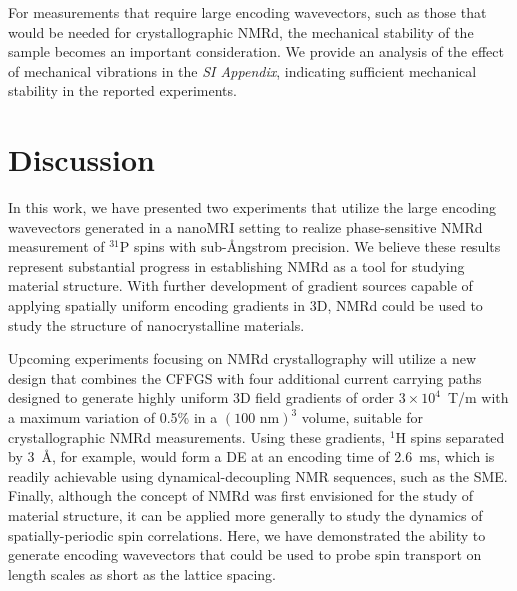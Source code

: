 \documentclass[9pt,twocolumn,twoside,lineno]{pnas-new}
\begin{document}
For measurements that require large encoding wavevectors, such as those that would be needed for crystallographic NMRd, the mechanical stability of the sample becomes an important consideration. We provide an analysis of the effect of mechanical vibrations in the \textit{SI Appendix}, indicating sufficient mechanical stability in the reported experiments.

\section*{Discussion}
In this work, we have presented two experiments that utilize the large encoding wavevectors generated in a nanoMRI setting to realize phase-sensitive NMRd measurement of ${}^{31}$P spins with sub-\AA ngstrom precision.
We believe these results represent substantial progress in establishing NMRd as a tool for studying material structure.
With further development of gradient sources capable of applying spatially uniform encoding gradients in 3D, NMRd could be used to study the structure of nanocrystalline materials.

Upcoming experiments focusing on NMRd crystallography will utilize a new design that combines the CFFGS with four additional current carrying paths designed to generate highly uniform 3D field gradients of order $3\times 10^4$~T/m with a maximum variation of 0.5\% in a $(100 \text{ nm})^3$ volume, suitable for crystallographic NMRd measurements. Using these gradients, ${}^{1}$H spins separated by 3~\AA, for example, would form a DE at an encoding time of 2.6~ms, which is readily achievable using dynamical-decoupling NMR sequences, such as the SME.
Finally, although the concept of NMRd was first envisioned for the study of material structure, it can be applied more generally to study the dynamics of spatially-periodic spin correlations.
Here, we have demonstrated the ability to generate encoding wavevectors that could be used to probe spin transport on length scales as short as the lattice spacing.



\showacknow{} %


\end{document}
